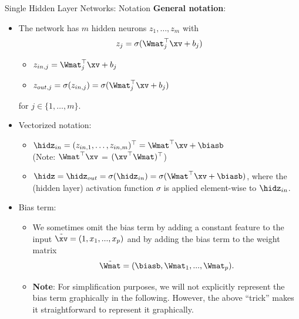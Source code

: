 \begin{vbframe}{Single Hidden Layer Networks: Notation}
  \textbf{General notation}:
  \begin{itemize}
    \vspace{4mm}
    \item The network has $m$ hidden neurons $z_1, \dots, z_m$ with
    $$ z_j = \sigma(\Wmat_j^\top \xv + b_j)$$
    \vspace{-0.5cm}
    \begin{itemize}
    \item $z_{in,j}  = \Wmat_j^\top \xv + b_j$
    \vspace{2mm}
    \item $z_{out,j} = \sigma(z_{in,j}) = \sigma(\Wmat_j^\top \xv + b_j)$
    \end{itemize}
    \vspace{4mm}
    for $j \in \{1,\ldots,m\}$.
    \vspace{4mm}

    \framebreak 

    \item Vectorized notation:
      \begin{itemize}
        \item $ \hidz_{in} = (z_{in,1}, \dots, z_{in,m})^\top = \Wmat^\top \xv + \biasb$ \\ (Note: $\Wmat^\top \xv$ = $(\xv^\top \Wmat)^\top$)
        \item $ \hidz = \hidz_{out} = \sigma(\hidz_{in}) = \sigma(\Wmat^\top \xv + \biasb)$, where the (hidden layer) activation function $\sigma$ is applied element-wise to $\hidz_{in}$.  
      \end{itemize}
      \item Bias term:         
      \begin{itemize}
        \item We sometimes omit the bias term by adding a constant feature to the input $\tilde{\xv} = (1, x_1, ..., x_p)$ and by adding the bias term to the weight matrix 
        $$
          \tilde{\Wmat} = (\biasb, \Wmat_1, ..., \Wmat_p). 
        $$ 
        \item \textbf{Note}: For simplification purposes, we will not explicitly represent the bias term graphically in the following. However, the above \enquote{trick} makes it straightforward to represent it graphically. 
      \end{itemize}
    \end{itemize}




\end{vbframe}
